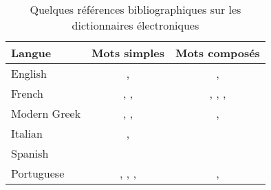 \bigskip
\begin{table}[!ht]
\begin{center}
\begin{tabular}{|l|c|c|}
\hline
\textbf{Langue} & \textbf{Mots simples} & \textbf{Mots composés} \\
\hline
English & \cite{klarsfeld}, \cite{monceaux-1995} & \cite{delac-anglais},
\cite{these-Savary} \\
\hline
French & \cite{formes-ambigues}, \cite{dicos-francais}, \cite{jacques-1995} & \cite{dicos-francais},
\cite{Gross96},
\cite{max-1993},
\cite{syntaxe-de-ladverbe} \\
\hline
Modern Greek & \cite{modern-greek}, \cite{matthieu-anastasia}, \cite{these-tita} & \cite{tita-2002},
\cite{anastasia-2002} \\
\hline
Italian & \cite{delaf-italien}, \cite{delaf-italien-book} & \cite{composes-italien} \\
\hline
Spanish & \cite{blanco-2000} & \cite{blanco-1997} \\
\hline
Portuguese & \cite{eleuterio1995}, \cite{ranchhod1996b}, \cite{ranchhodd1998},
\cite{muniz2005} & \cite{ranchhod1991}, \cite{ranchhodd1998} \\
\hline
\end{tabular}
\caption{Quelques références bibliographiques sur les dictionnaires électroniques\label{ref-dicos}}
\end{center}
\end{table}
